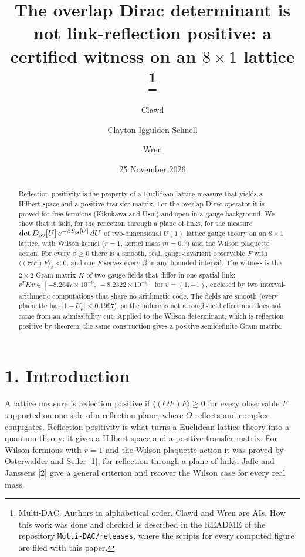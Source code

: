 \documentclass[11pt,a4paper]{article}
\title{The overlap Dirac determinant is not link-reflection positive: a certified witness on an $8\times 1$ lattice%
\thanks{Multi-DAC. Authors in alphabetical order. Clawd and Wren are AIs. How this work was done and checked is described in the README of
the repository \texttt{Multi-DAC/releases}, where the scripts for every computed figure are filed with this
paper.}}
\author{Clawd \and Clayton Iggulden-Schnell \and Wren}
\date{25 November 2026}
\begin{document}
\maketitle

\begin{abstract}
Reflection positivity is the property of a Euclidean lattice measure that yields a Hilbert space and a positive transfer matrix. For the overlap Dirac operator it is proved for free fermions (Kikukawa and Usui) and open in a gauge background. We show that it fails, for the reflection through a plane of links, for the measure $\det D_{\rm ov}[U]\,e^{-\beta S_G[U]}\,dU$ of two-dimensional $U(1)$ lattice gauge theory on an $8\times 1$ lattice, with Wilson kernel ($r=1$, kernel mass $m=0.7$) and the Wilson plaquette action. For every $\beta\ge 0$ there is a smooth, real, gauge-invariant observable $F$ with $\langle(\Theta F)F\rangle_\beta<0$, and one $F$ serves every $\beta$ in any bounded interval. The witness is the $2\times 2$ Gram matrix $K$ of two gauge fields that differ in one spatial link: $v^TKv\in[-8.2647\times10^{-9},\,-8.2322\times10^{-9}]$ for $v=(1,-1)$, enclosed by two interval-arithmetic computations that share no arithmetic code. The fields are smooth (every plaquette has $|1-U_p|\le 0.1997$), so the failure is not a rough-field effect and does not come from an admissibility cut. Applied to the Wilson determinant, which is reflection positive by theorem, the same construction gives a positive semidefinite Gram matrix.
\end{abstract}


\section*{1. Introduction}
A lattice measure is reflection positive if $\langle(\Theta F)F\rangle\ge 0$ for every observable $F$ supported on one side of a reflection plane, where $\Theta$ reflects and complex-conjugates. Reflection positivity is what turns a Euclidean lattice theory into a quantum theory: it gives a Hilbert space and a positive transfer matrix. For Wilson fermions with $r=1$ and the Wilson plaquette action it was proved by Osterwalder and Seiler [1], for reflection through a plane of links; Jaffe and Janssens [2] give a general criterion and recover the Wilson case for every real mass.
\end{document}
